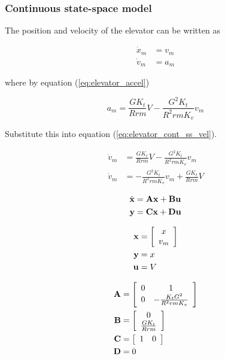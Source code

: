 \subsubsection{Continuous state-space model}

The position and velocity of the elevator can be written as

\begin{align}
  \dot{x}_m &= v_m \label{eq:elevator_cont_ss_pos} \\
  \dot{v}_m &= a_m \label{eq:elevator_cont_ss_vel}
\end{align}

where by equation (\ref{eq:elevator_accel})

\begin{equation*}
  a_m = \frac{GK_t}{Rrm} V - \frac{G^2 K_t}{R^2 rm K_v} v_m
\end{equation*}

Substitute this into equation (\ref{eq:elevator_cont_ss_vel}).

\begin{align}
  \dot{v}_m &= \frac{GK_t}{Rrm} V - \frac{G^2 K_t}{R^2 rm K_v} v_m \nonumber \\
  \dot{v}_m &= -\frac{G^2 K_t}{R^2 rm K_v} v_m + \frac{GK_t}{Rrm} V
\end{align}

\begin{align*}
  \dot{\mathbf{x}} &= \mathbf{A} \mathbf{x} + \mathbf{B} \mathbf{u} \\
  \mathbf{y} &= \mathbf{C} \mathbf{x} + \mathbf{D} \mathbf{u}
\end{align*}

\begin{align*}
  \mathbf{x} &= \left[
  \begin{array}{c}
    x \\
    v_m
  \end{array}
  \right] \\
  \mathbf{y} &= x \\
  \mathbf{u} &= V
\end{align*}

\begin{align}
  \mathbf{A} &= \left[
  \begin{array}{cc}
    0 & 1 \\
    0 & -\frac{K_t G^2}{R^2rmK_v}
  \end{array}
  \right] \\
  \mathbf{B} &= \left[
  \begin{array}{c}
    0 \\
    \frac{GK_t}{Rrm}
  \end{array}
  \right] \\
  \mathbf{C} &= \left[
  \begin{array}{cc}
    1 & 0
  \end{array}
  \right] \\
  \mathbf{D} &= 0
\end{align}

